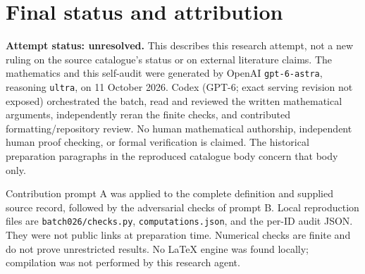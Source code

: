 \documentclass[11pt]{article}
\begin{document}
\section{Final status and attribution}
\textbf{Attempt status: unresolved.} This describes this research attempt, not a new ruling on the source catalogue's status or on external literature claims.
The mathematics and this self-audit were generated by OpenAI \texttt{gpt-6-astra}, reasoning \texttt{ultra}, on 11 October 2026. Codex (GPT-6; exact serving revision not exposed) orchestrated the batch, read and reviewed the written mathematical arguments, independently reran the finite checks, and contributed formatting/repository review. No human mathematical authorship, independent human proof checking, or formal verification is claimed. The historical preparation paragraphs in the reproduced catalogue body concern that body only.

Contribution prompt A was applied to the complete definition and supplied source record, followed by the adversarial checks of prompt B. Local reproduction files are \texttt{batch026/checks.py}, \texttt{computations.json}, and the per-ID audit JSON. They were not public links at preparation time. Numerical checks are finite and do not prove unrestricted results. No LaTeX engine was found locally; compilation was not performed by this research agent.
\end{document}
